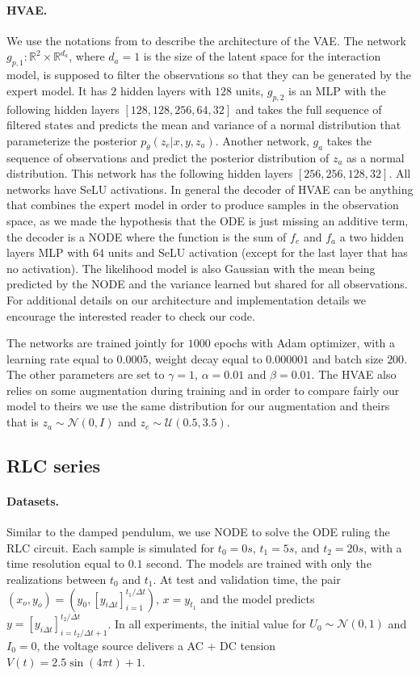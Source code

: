 \documentclass{article}
\begin{document}
\paragraph{HVAE.}
We use the notations from \citet{HVAE} to describe the architecture of the VAE. The network $g_{p, 1}: \mathbb{R}^2 \times \mathbb{R}^{d_a}$, where $d_a=1$ is the size of the latent space for the interaction model, is supposed to filter the observations so that they can be generated by the expert model. It has $2$ hidden layers with $128$ units, $g_{p, 2}$ is an MLP with the following hidden layers $\left[128, 128, 256, 64, 32\right]$ and takes the full sequence of filtered states and predicts the mean and variance of a normal distribution that parameterize the posterior $p_\theta(z_e|x, y, z_a)$. Another network, $g_a$ takes the sequence of observations and predict the posterior distribution of $z_a$ as a normal distribution. This network has the following hidden layers $\left[256, 256, 128, 32\right]$. All networks have SeLU activations. In general the decoder of HVAE can be anything that combines the expert model in order to produce samples in the observation space, as we made the hypothesis that the ODE is just missing an additive term, the decoder is a NODE where the function is the sum of $f_e$ and $f_a$ a two hidden layers MLP with $64$ units and SeLU activation (except for the last layer that has no activation). The likelihood model is also Gaussian with the mean being predicted by the NODE and the variance learned but shared for all observations. For additional details on our architecture and implementation details we encourage the interested reader to check our code. 

The networks are trained jointly for $1000$ epochs with Adam optimizer, with a learning rate equal to $0.0005$, weight decay equal to $0.000001$ and batch size $200$. The other parameters are set to $\gamma = 1$, $\alpha=0.01$ and $\beta=0.01$. The HVAE also relies on some augmentation during training and in order to compare fairly our model to theirs we use the same distribution for our augmentation and theirs that is $z_a \sim \mathcal{N}(0, I)$ and $z_e \sim \mathcal{U}(0.5, 3.5)$. 

\subsection{RLC series}
\paragraph{Datasets.}
Similar to the damped pendulum, we use NODE to solve the ODE ruling the RLC circuit. Each sample is simulated for $t_0=0s$, $t_1=5s$, and $t_2=20s$, with a time resolution equal to $0.1$ second. The models are trained with only the realizations between $t_0$ and $t_1$. At test and validation time, the pair $(x_o, y_o) = (y_0, [y_{i\Delta t}]_{i=1}^{t_1 \!/\! \Delta t})$, $x=y_{t_1}$ and the model predicts $y=[y_{i\Delta t}]_{i=t_2 \!/\! \Delta t + 1}^{t_2 \!/\! \Delta t}$. In all experiments, the initial value for $U_0 \sim \mathcal{N}(0, 1)$ and $I_0=0$, the voltage source delivers a AC + DC tension $V(t) = 2.5 \sin(4 \pi t) + 1$.
\end{document}
